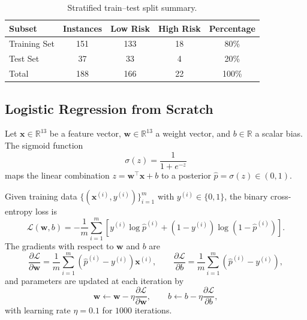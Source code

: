 \documentclass[conference]{IEEEtran}
\begin{document}
\begin{table}[!t]
\caption{Stratified train--test split summary.}
\label{tab:split}
\centering
\begin{tabular}{lcccc}
\toprule
Subset & Instances & Low Risk & High Risk & Percentage \\
\midrule
Training Set & 151 & 133 & 18 & 80\% \\
Test Set & 37 & 33 & 4 & 20\% \\
Total & 188 & 166 & 22 & 100\% \\
\bottomrule
\end{tabular}
\end{table}

\subsection{Logistic Regression from Scratch}
Let $\mathbf{x}\in\mathbb{R}^{13}$ be a feature vector, $\mathbf{w}\in\mathbb{R}^{13}$ a weight vector, and $b\in\mathbb{R}$ a scalar bias. The sigmoid function
\begin{equation}
\sigma(z) = \frac{1}{1 + e^{-z}}
\end{equation}
maps the linear combination $z = \mathbf{w}^\top\mathbf{x} + b$ to a posterior $\hat{p} = \sigma(z) \in (0,1)$.

Given training data $\{(\mathbf{x}^{(i)}, y^{(i)})\}_{i=1}^{m}$ with $y^{(i)}\in\{0,1\}$, the binary cross-entropy loss is
\begin{equation}
\mathcal{L}(\mathbf{w},b) = -\frac{1}{m} \sum_{i=1}^{m} \left[ y^{(i)} \log \hat{p}^{(i)} + (1-y^{(i)}) \log(1-\hat{p}^{(i)}) \right].
\end{equation}
The gradients with respect to $\mathbf{w}$ and $b$ are
\begin{equation}
\frac{\partial \mathcal{L}}{\partial \mathbf{w}} = \frac{1}{m}\sum_{i=1}^{m} (\hat{p}^{(i)}-y^{(i)})\mathbf{x}^{(i)},
\qquad
\frac{\partial \mathcal{L}}{\partial b} = \frac{1}{m}\sum_{i=1}^{m} (\hat{p}^{(i)}-y^{(i)}),
\end{equation}
and parameters are updated at each iteration by
\begin{equation}
\mathbf{w} \leftarrow \mathbf{w} - \eta \frac{\partial \mathcal{L}}{\partial \mathbf{w}},
\qquad
b \leftarrow b - \eta \frac{\partial \mathcal{L}}{\partial b},
\end{equation}
with learning rate $\eta = 0.1$ for $1000$ iterations.
\end{document}
